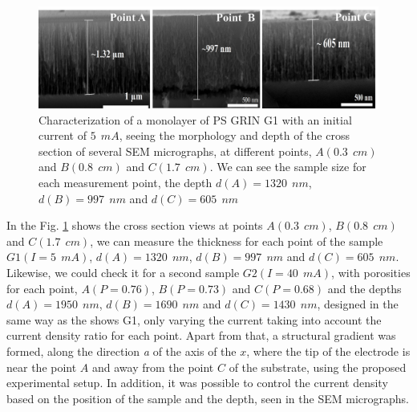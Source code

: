 \documentclass{article}
\begin{document}
\begin{figure}
  \centering
  \includegraphics[width=\textwidth]{Images/semD11}
  \caption{Characterization of a monolayer of PS GRIN G1
      with an initial current of $ 5 \ \ mA $, seeing the
      morphology and depth of the cross section of several SEM
      micrographs, at different points, $ A (0.3 \ \ cm) $ and $
      B (0.8 \ \ cm) $ and $ C (1.7 \ \ cm) $. We can see the
      sample size for each measurement point, the depth $ d (A)
      = 1320 \ \ nm $, $ d (B) = 997 \ \ nm $ and $ d (C) = 605
      \ \ nm $ }
  \label{fig:DR4}
\end{figure}
In the Fig. \ref{fig:DR4} shows the cross section views   at points $
A (0.3 \ \ cm) $, $ B (0.8 \ \ cm) $ and $ C (1.7 \ \ cm) $, we can
measure the thickness for each point of the sample $ G1 (I = 5 \ \ mA)
$, $ d (A) = 1320 \ \ nm $, $ d (B) = 997 \ \ nm $ and $ d (C) = 605 \
\ nm $. Likewise, we could check it for a second sample $ G2 (I = 40 \
\ mA) $, with porosities for each point, $ A (P = 0.76) $, $ B (P =
0.73) $ and $ C (P = 0.68) $ and the depths $ d (A) = 1950 \ \ nm $, $
d (B) = 1690 \ \ nm $ and $ d (C) = 1430 \ \ nm $, designed in the
same way as the shows G1, only varying the current taking into account
the current density ratio for each point. Apart from that, a
structural gradient was formed, along the direction \emph{ a}  of the
axis of the $ x $, where the tip of the electrode is near the point $
A $ and away from the point $ C $ of the substrate, using the proposed
experimental setup. In addition, it was possible to control the
current density based on the position of the sample and the depth,
seen in the SEM micrographs.
\end{document}
